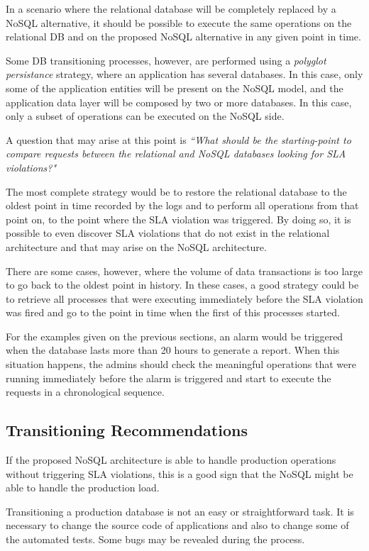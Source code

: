 In a scenario where the relational database will be completely replaced by a NoSQL alternative, it should be possible to execute the same operations on the relational DB and on the proposed NoSQL alternative in any given point in time.

Some DB transitioning processes, however, are performed using a \textit{polyglot persistance} strategy, where an application has several databases. In this case, only some of the application entities will be present on the NoSQL model, and the application data layer will be composed by two or more databases. In this case, only a subset of operations can be executed on the NoSQL side.

A question that may arise at this point is \textit{``What should be the starting-point to compare requests between the relational and NoSQL databases looking for SLA violations?"}

The most complete strategy would be to restore the relational database to the oldest point in time recorded by the logs and to perform all operations from that point on, to the point where the SLA violation was triggered. By doing so, it is possible to even discover SLA violations that do not exist in the relational architecture and that may arise on the NoSQL architecture.

There are some cases, however, where the volume of data transactions is too large to go back to the oldest point in history. In these cases, a good strategy could be to retrieve all processes that were executing immediately before the SLA violation was fired and go to the point in time when the first of this processes started. 

For the examples given on the previous sections, an alarm would be triggered when the database lasts more than 20 hours to generate a report. When this situation happens, the admins should check the meaningful operations that were running immediately before the alarm is triggered and start to execute the requests in a chronological sequence. 

\subsection{Transitioning Recommendations}
\label{transitioning-recommendations}
If the proposed NoSQL architecture is able to handle production operations without triggering SLA violations, this is a good sign that the NoSQL might be able to handle the production load.

Transitioning a production database is not an easy or straightforward task. It is necessary to change the source code of applications and also to change some of the automated tests. Some bugs may be revealed during the process. 

